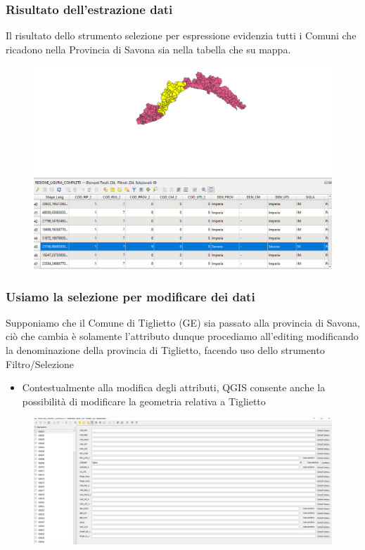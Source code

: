 \documentclass{beamer}
\begin{document}
{\begin{frame}
 
		
		    
\end{frame}



 \begin{frame}
   \frametitle{Risultato dell'estrazione dati}
   Il risultato dello strumento selezione per espressione evidenzia tutti i Comuni che ricadono nella Provincia di Savona sia nella tabella che su mappa.
   \begin{figure}
       \centering
       \includegraphics[width=0.8\linewidth]{savona.png}
       
       
   \end{figure}
		    
\end{frame}

 \begin{frame}
   \frametitle{Usiamo la selezione per modificare dei dati}
   Supponiamo che il Comune di Tiglietto (GE) sia passato alla provincia di Savona, ciò che cambia è solamente l'attributo dunque procediamo all'editing modificando la denominazione della provincia di Tiglietto, facendo uso dello strumento Filtro/Selezione
   \begin{itemize}
       \item Contestualmente alla modifica degli attributi, QGIS consente anche la possibilità di modificare la geometria relativa a Tiglietto
   \end{itemize}
   \begin{figure}
       \centering
       \includegraphics[width=0.75\linewidth]{tiglietto.png}
       

\end{figure}
\end{frame}}
\end{document}
